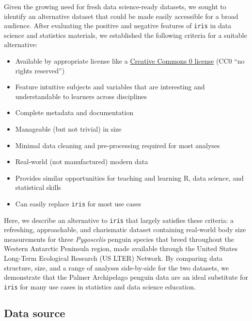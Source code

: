 Given the growing need for fresh data science-ready datasets, we sought
to identify an alternative dataset that could be made easily accessible
for a broad audience. After evaluating the positive and negative
features of \texttt{iris} in data science and statistics materials, we
established the following criteria for a suitable alternative:

\begin{itemize}
\tightlist
\item
  Available by appropriate license like a
  \href{https://creativecommons.org/share-your-work/public-domain/cc0/}{Creative
  Commons 0 license} (CC0 ``no rights reserved'')
\item
  Feature intuitive subjects and variables that are interesting and
  understandable to learners across disciplines
\item
  Complete metadata and documentation
\item
  Manageable (but not trivial) in size
\item
  Minimal data cleaning and pre-processing required for most analyses
\item
  Real-world (not manufactured) modern data
\item
  Provides similar opportunities for teaching and learning R, data
  science, and statistical skills
\item
  Can easily replace \texttt{iris} for most use cases
\end{itemize}

Here, we describe an alternative to \texttt{iris} that largely satisfies
these criteria: a refreshing, approachable, and charismatic dataset
containing real-world body size measurements for three \emph{Pygoscelis}
penguin species that breed throughout the Western Antarctic Peninsula
region, made available through the United States Long-Term Ecological
Research (US LTER) Network. By comparing data structure, size, and a
range of analyses side-by-side for the two datasets, we demonstrate that
the Palmer Archipelago penguin data are an ideal substitute for
\texttt{iris} for many use cases in statistics and data science
education.

\hypertarget{data-source}{%
\subsection{Data source}\label{data-source}}


